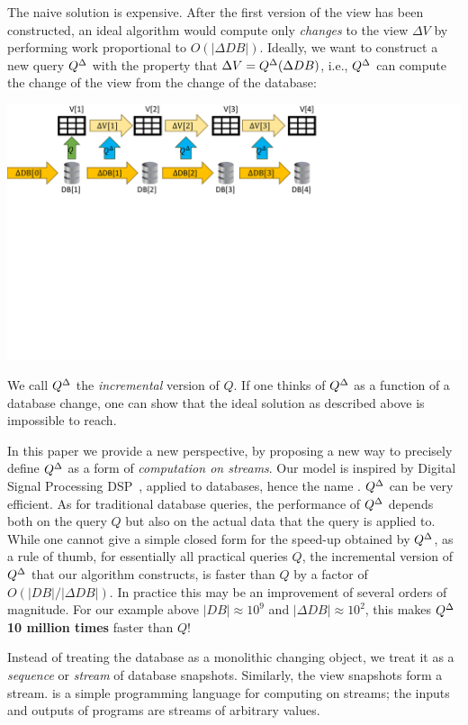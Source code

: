 The naive solution is expensive.  After the first version of the view
has been constructed, an ideal algorithm would compute only
\emph{changes} to the view $\Delta V$ by performing work proportional
to $O(|\Delta DB|)$.  Ideally, we want to construct a new query
${Q}^{\Delta}$ with the property that $\Delta V = {Q}^{\Delta}(\Delta DB)$,
i.e., ${Q}^{\Delta}$ can compute the change of the view from the change of
the database:

\includegraphics[trim={0 4.5in 4.1in 0},clip,scale=.30]{incview.pdf}

We call ${Q}^{\Delta}$ the \emph{incremental} version of $Q$.  If one
thinks of ${Q}^{\Delta}$ as a function of a database change, one can show
that the ideal solution as described above is impossible to reach.

In this paper we provide a new perspective, by proposing a new way to
precisely define ${Q}^{\Delta}$ as a form of \emph{computation on streams}.
Our model is inspired by Digital Signal Processing
DSP~\cite{rabiner-book75}, applied to databases, hence the name \dbsp.
${Q}^{\Delta}$ can be very efficient.  As for traditional database queries,
the performance of ${Q}^{\Delta}$ depends both on the query $Q$ but also on
the actual data that the query is applied to.  While one cannot give a
simple closed form for the speed-up obtained by ${Q}^{\Delta}$, as a rule
of thumb, for essentially all practical queries $Q$, the incremental
version of ${Q}^{\Delta}$ that our algorithm constructs, is faster than $Q$
by a factor of $O(|DB| / |\Delta DB|)$.  In practice this may be an
improvement of several orders of magnitude.  For our example above
$|DB| \approx 10^9$ and $|\Delta DB| \approx 10^2$, this makes
${Q}^{\Delta}$ \textbf{10 million times} faster than $Q$!

Instead of treating the database as a monolithic changing object, we
treat it as a \emph{sequence} or \emph{stream} of database snapshots.
Similarly, the view snapshots form a stream.  \dbsp is a simple
programming language for computing on streams; the inputs and outputs
of \dbsp programs are streams of arbitrary values.

